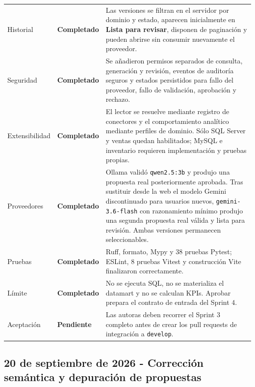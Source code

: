 \documentclass[11pt,letterpaper]{article}
\newcommand{\statusok}{\textcolor{deepgreen}{\textbf{Completado}}}
\newcommand{\statuspending}{\textcolor{warning}{\textbf{Pendiente}}}
\newcommand{\file}[1]{\texttt{#1}}
\begin{document}
\begin{longtable}{@{}p{}p{}p{}@{}}
  Historial & \statusok & Las versiones se filtran en el servidor por dominio y estado, aparecen inicialmente en \textbf{Lista para revisar}, disponen de paginación y pueden abrirse sin consumir nuevamente el proveedor. \\
  Seguridad & \statusok & Se añadieron permisos separados de consulta, generación y revisión, eventos de auditoría seguros y estados persistidos para fallo del proveedor, fallo de validación, aprobación y rechazo. \\
  Extensibilidad & \statusok & El lector se resuelve mediante registro de conectores y el comportamiento analítico mediante perfiles de dominio. Sólo SQL Server y ventas quedan habilitados; MySQL e inventario requieren implementación y pruebas propias. \\
  Proveedores & \statusok & Ollama validó \file{qwen2.5:3b} y produjo una propuesta real posteriormente aprobada. Tras sustituir desde la web el modelo Gemini discontinuado para usuarios nuevos, \file{gemini-3.6-flash} con razonamiento mínimo produjo una segunda propuesta real válida y lista para revisión. Ambas versiones permanecen seleccionables. \\
  Pruebas & \statusok & Ruff, formato, Mypy y 38 pruebas Pytest; ESLint, 8 pruebas Vitest y construcción Vite finalizaron correctamente. \\
  Límite & \statusok & No se ejecuta SQL, no se materializa el datamart y no se calculan KPIs. Aprobar prepara el contrato de entrada del Sprint 4. \\
  Aceptación & \statuspending & Las autoras deben recorrer el Sprint 3 completo antes de crear los pull requests de integración a \file{develop}. \\
  \bottomrule
\end{longtable}

\subsection{20 de septiembre de 2026 - Corrección semántica y depuración de propuestas}
\end{document}
